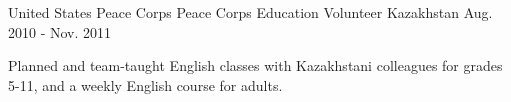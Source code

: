 \begin{cventries}
\vspace{-2ex}
  \cventry
    {United States Peace Corps}
    {Peace Corps Education Volunteer}
    {Kazakhstan}
    {Aug. 2010 - Nov. 2011}
    {
      \begin{cvitems}
        \item {Planned and team-taught English classes with Kazakhstani colleagues for grades 5-11, and a weekly English course for adults.}%
      \end{cvitems}
    }
\end{cventries}